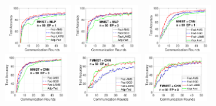 \documentclass[nohyperref]{article}
\begin{document}
\begin{figure}[t]
    \begin{center}
        \mbox{
        \hspace{-0.1in}\includegraphics[width=0.25\textwidth]{new_fmnist_mnist_fig/mnist_testerror_mlp_ep1_iid0_reddi.pdf}
                \hspace{-0.1in}\includegraphics[width=0.25\textwidth]{new_fmnist_mnist_fig/mnist_testerror_mlp_ep3_iid0_reddi.pdf}
                }
        \mbox{
                \hspace{-0.1in}\includegraphics[width=0.25\textwidth]{new_fmnist_mnist_fig/mnist_testerror_cnn_ep1_iid0_reddi.pdf}
                \hspace{-0.1in}\includegraphics[width=0.25\textwidth]{new_fmnist_mnist_fig/mnist_testerror_cnn_ep3_iid0_reddi.pdf}
                }
        \mbox{
                \hspace{-0.1in}\includegraphics[width=0.25\textwidth]{new_fmnist_mnist_fig/fmnist_testerror_cnn_ep1_iid0_reddi.pdf}
        \hspace{-0.1in}\includegraphics[width=0.25\textwidth]{new_fmnist_mnist_fig/fmnist_testerror_cnn_ep3_iid0_reddi.pdf}
}
\end{center}
\end{figure}
\end{document}
